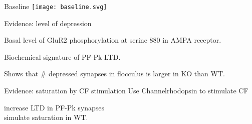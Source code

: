\documentclass[final]{beamer}%
\begin{document}

\begin{frame}{Baseline}
%
    \texttt{[image: baseline.svg]}

%
\end{frame}


\begin{frame}{Evidence: level of depression}
%
 \hp
 \parbox[t]{0.45\linewidth}{%
 Basal level of GluR2 phosphorylation at serine 880 in AMPA receptor.

 \vp Biochemical signature of PF-Pk LTD.

 \vp Shows that \# depressed synapses in flocculus is larger in KO than WT.
 }
%
\end{frame}


\begin{frame}{Evidence: saturation by CF stimulation}
%
 Use Channelrhodopsin to stimulate CF \parbox[t]{0.45\linewidth}{%
 \lto increase LTD in PF-Pk synapses \\
 \lto simulate saturation in WT.
 }

 \vp\begin{center}
   \hspace{0.05\linewidth}
   \hspace{0.05\linewidth}
 \end{center}
%
\end{frame}

\end{document}
